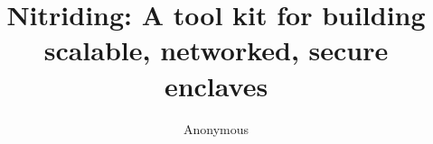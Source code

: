 \documentclass[letterpaper,twocolumn,10pt]{article}
\begin{document}
\title{\Large \bf Nitriding: A tool kit for building\\scalable, networked, secure enclaves}

\author{Anonymous}

\maketitle












\balance
\printbibliography

\appendix


\end{document}
